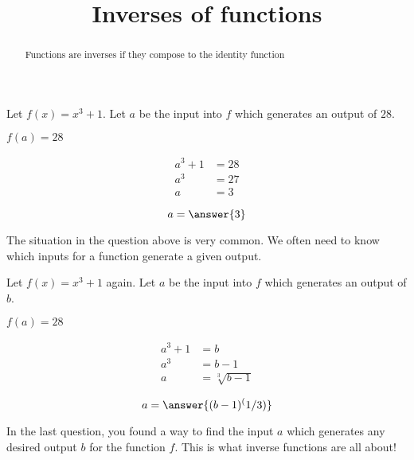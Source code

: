 \documentclass{ximera}
\title{Inverses of functions}
\begin{document}
\begin{abstract}
	Functions are inverses if they compose to the identity function
\end{abstract}
\maketitle

\begin{question}
	Let $f(x) = x^3+1$. Let $a$ be the input into $f$ which generates an output of $28$.
	
	\begin{hint}
		 $f(a) = 28$
	\end{hint}
	\begin{hint}
		\begin{align*}
			a^3+1 &= 28\\
			a^3 &= 27\\
			a &= 3 
		\end{align*}
	\end{hint}
	  \[a = \answer{3}\] 
\end{question}

The situation in the question above is very common.  We often need to know which inputs for a function generate a given output.

\begin{question}
		Let $f(x) = x^3+1$ again. Let $a$ be the input into $f$ which generates an output of $b$.
	
	\begin{hint}
		 $f(a) = 28$
	\end{hint}
	\begin{hint}
		\begin{align*}
			a^3+1 &= b\\
			a^3 &= b-1\\
			a &= \sqrt[3]{b-1} 
		\end{align*}
	\end{hint}
	  \[a = \answer{(b-1)^(1/3)}\] 
\end{question}

In the last question, you found a way to find the input $a$ which generates any desired output $b$ for the function $f$.  This is what inverse functions are all about!
\end{document}
